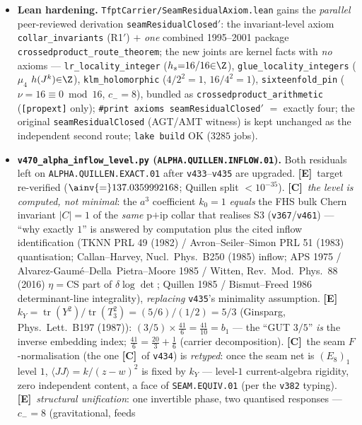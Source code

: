 \documentclass[11pt]{article}
\providecommand{\mE}{\textbf{[E]}}\providecommand{\mC}{\textbf{[C]}}
\begin{document}
\begin{itemize}
\item \textbf{Lean hardening.} \texttt{TfptCarrier/SeamResidualAxiom.lean} gains the \emph{parallel}
peer-reviewed derivation \texttt{seamResidualClosed$'$}: the invariant-level axiom
\texttt{collar\_invariants} (R1$'$) $+$ \emph{one} combined 1995--2001 package
\texttt{crossedproduct\_route\_theorem}; the new joints are kernel facts with \emph{no} axioms ---
\texttt{lr\_locality\_integer} ($h_s{=}16/16{\in}\Z$), \texttt{glue\_locality\_integers}
($\mu_4$ $h(J^k){\in}\Z$), \texttt{klm\_holomorphic} ($4/2^2{=}1$, $16/4^2{=}1$),
\texttt{sixteenfold\_pin} ($\nu{=}16{\equiv}0\bmod 16$, $c_-{=}8$), bundled as
\texttt{crossedproduct\_arithmetic} (\texttt{[propext]} only); \texttt{\#print axioms
seamResidualClosed$'$} $=$ exactly four; the original \texttt{seamResidualClosed} (AGT/AMT witness)
is kept unchanged as the independent second route; \texttt{lake build} OK ($3285$ jobs).
\item \textbf{\texttt{v470\_alpha\_inflow\_level.py} (\texttt{ALPHA.QUILLEN.INFLOW.01}).}
Both residuals left on \texttt{ALPHA.QUILLEN.EXACT.01} after \texttt{v433}--\texttt{v435} are
upgraded. \mE\ target re-verified ($\ainv{=}137.0359992168$; Quillen split ${<}10^{-35}$).
\mC\ \emph{the level is computed, not minimal}: the $a^3$ coefficient $k_0{=}1$ \emph{equals} the
FHS bulk Chern invariant $|C|{=}1$ of the \emph{same} p$+$ip collar that realises S3
(\texttt{v367}/\texttt{v461}) --- ``why exactly $1$'' is answered by computation plus the cited
inflow identification (TKNN PRL 49 (1982) / Avron--Seiler--Simon PRL 51 (1983) quantisation;
Callan--Harvey, Nucl.\ Phys.\ B250 (1985) inflow; APS 1975 / Alvarez-Gaum\'e--Della~Pietra--Moore
1985 / Witten, Rev.\ Mod.\ Phys.\ 88 (2016) $\eta{=}$CS part of $\delta\log\det$; Quillen 1985 /
Bismut--Freed 1986 determinant-line integrality), \emph{replacing} \texttt{v435}'s minimality
assumption. \mE\ $k_Y{=}\operatorname{tr}(Y^2)/\operatorname{tr}(T_3^2){=}(5/6)/(1/2){=}5/3$
(Ginsparg, Phys.\ Lett.\ B197 (1987)): $(3/5){\times}\tfrac{41}{6}{=}\tfrac{41}{10}{=}b_1$ --- the
``GUT $3/5$'' \emph{is} the inverse embedding index; $\tfrac{41}{6}{=}\tfrac{20}{3}{+}\tfrac16$
(carrier decomposition). \mC\ the seam $F$-normalisation (the one \mC\ of \texttt{v434}) is
\emph{retyped}: once the seam net is $(E_8)_1$ level $1$, $\langle JJ\rangle{=}k/(z{-}w)^2$ is fixed
by $k_Y$ --- level-$1$ current-algebra rigidity, zero independent content, a face of
\texttt{SEAM.EQUIV.01} (per the \texttt{v382} typing). \mE\ \emph{structural unification}: one
invertible phase, two quantised responses --- $c_-{=}8$ (gravitational, feeds

\end{itemize}
\end{document}
